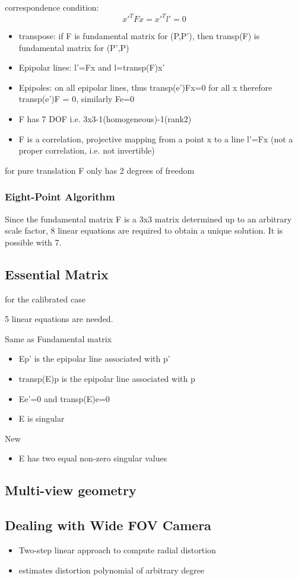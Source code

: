 correspondence condition: 
$$x'^TFx=x'^T l'=0$$

\begin{itemize}
	\item transpose: if F is fundamental matrix for (P,P'), then transp(F) is fundamental matrix for (P',P)
	\item Epipolar lines: l'=Fx and l=transp(F)x'
	\item Epipoles: on all epipolar lines, thus transp(e')Fx=0 for all x therefore transp(e')F = 0, similarly Fe=0
	\item F has 7 DOF i.e. 3x3-1(homogeneous)-1(rank2)
	\item F is a correlation, projective mapping from a point x to a line l'=Fx (not a proper correlation, i.e. not invertible)
\end{itemize}

for pure translation F only has 2 degrees of freedom

\subsubsection{Eight-Point Algorithm}
Since the fundamental matrix F is a 3x3 matrix determined up to an arbitrary scale factor, 8 linear equations are required to obtain a unique solution. It is possible with 7.

\subsection{Essential Matrix}
for the calibrated case

5 linear equations are needed.

Same as Fundamental matrix
\begin{itemize}
	\item Ep' is the epipolar line associated with p'
	\item transp(E)p is the epipolar line associated with p
	\item Ee'=0 and transp(E)e=0
	\item E is singular
\end{itemize}

New

\begin{itemize}
	\item E has two equal non-zero singular values
\end{itemize}


\subsection{Multi-view geometry}


\subsection{Dealing with Wide FOV Camera}
\begin{itemize}
	\item Two-step linear approach to compute radial distortion
	\item estimates distortion polynomial of arbitrary degree
\end{itemize}